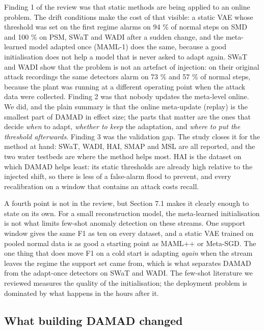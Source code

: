 Finding 1 of the review was that static methods are being applied to an online problem. The drift conditions make the cost of that visible: a static VAE whose threshold was set on the first regime alarms on 94 \% of normal steps on SMD and 100 \% on PSM, SWaT and WADI after a sudden change, and the meta-learned model adapted once (MAML-1) does the same, because a good initialisation does not help a model that is never asked to adapt again. SWaT and WADI show that the problem is not an artefact of injection: on their original attack recordings the same detectors alarm on 73 \% and 57 \% of normal steps, because the plant was running at a different operating point when the attack data were collected. Finding 2 was that nobody updates the meta-level online. We did, and the plain summary is that the online meta-update (replay) is the smallest part of DAMAD in effect size; the parts that matter are the ones that decide \emph{when} to adapt, \emph{whether to keep} the adaptation, and \emph{where to put the threshold afterwards}. Finding 3 was the validation gap. The study closes it for the method at hand: SWaT, WADI, HAI, SMAP and MSL are all reported, and the two water testbeds are where the method helps most. HAI is the dataset on which DAMAD helps least: its static thresholds are already high relative to the injected shift, so there is less of a false-alarm flood to prevent, and every recalibration on a window that contains an attack costs recall.

A fourth point is not in the review, but Section 7.1 makes it clearly enough to state on its own. For a small reconstruction model, the meta-learned initialisation is not what limits few-shot anomaly detection on these streams. One support window gives the same F1 as ten on every dataset, and a static VAE trained on pooled normal data is as good a starting point as MAML++ or Meta-SGD. The one thing that does move F1 on a cold start is adapting \emph{again} when the stream leaves the regime the support set came from, which is what separates DAMAD from the adapt-once detectors on SWaT and WADI. The few-shot literature we reviewed measures the quality of the initialisation; the deployment problem is dominated by what happens in the hours after it.

\hypertarget{what-building-damad-changed}{%
\subsection{What building DAMAD changed}\label{what-building-damad-changed}}

